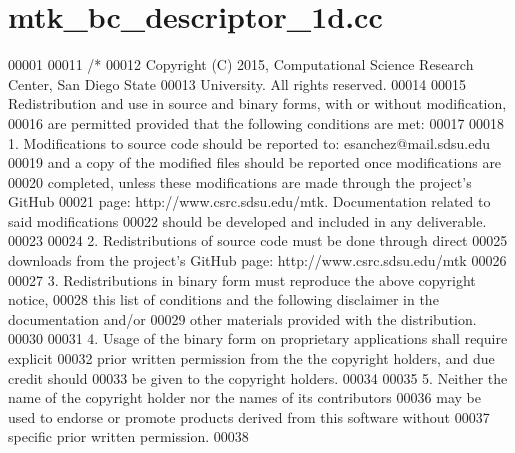 \hypertarget{mtk__bc__descriptor__1d_8cc_source}{\section{mtk\+\_\+bc\+\_\+descriptor\+\_\+1d.\+cc}
\label{mtk__bc__descriptor__1d_8cc_source}
}

\begin{DoxyCode}
00001 
00011 \textcolor{comment}{/*}
00012 \textcolor{comment}{Copyright (C) 2015, Computational Science Research Center, San Diego State}
00013 \textcolor{comment}{University. All rights reserved.}
00014 \textcolor{comment}{}
00015 \textcolor{comment}{Redistribution and use in source and binary forms, with or without modification,}
00016 \textcolor{comment}{are permitted provided that the following conditions are met:}
00017 \textcolor{comment}{}
00018 \textcolor{comment}{1. Modifications to source code should be reported to: esanchez@mail.sdsu.edu}
00019 \textcolor{comment}{and a copy of the modified files should be reported once modifications are}
00020 \textcolor{comment}{completed, unless these modifications are made through the project's GitHub}
00021 \textcolor{comment}{page: http://www.csrc.sdsu.edu/mtk. Documentation related to said modifications}
00022 \textcolor{comment}{should be developed and included in any deliverable.}
00023 \textcolor{comment}{}
00024 \textcolor{comment}{2. Redistributions of source code must be done through direct}
00025 \textcolor{comment}{downloads from the project's GitHub page: http://www.csrc.sdsu.edu/mtk}
00026 \textcolor{comment}{}
00027 \textcolor{comment}{3. Redistributions in binary form must reproduce the above copyright notice,}
00028 \textcolor{comment}{this list of conditions and the following disclaimer in the documentation and/or}
00029 \textcolor{comment}{other materials provided with the distribution.}
00030 \textcolor{comment}{}
00031 \textcolor{comment}{4. Usage of the binary form on proprietary applications shall require explicit}
00032 \textcolor{comment}{prior written permission from the the copyright holders, and due credit should}
00033 \textcolor{comment}{be given to the copyright holders.}
00034 \textcolor{comment}{}
00035 \textcolor{comment}{5. Neither the name of the copyright holder nor the names of its contributors}
00036 \textcolor{comment}{may be used to endorse or promote products derived from this software without}
00037 \textcolor{comment}{specific prior written permission.}
00038 \textcolor{comment}{}

\end{DoxyCode}
